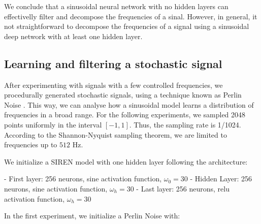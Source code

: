 We conclude that a sinusoidal neural network with no hidden layers can effectivelly filter and decompose the frequencies of a sinal. However, in general, it not straightforward to decompose the frequencies of a signal using a sinusoidal deep network with at least one hidden layer.

\pagebreak

\subsection{Learning and filtering a stochastic signal}




After experimenting with signals with a few controlled frequencies, we procedurally generated stochastic signals, using a technique known as Perlin Noise \cite{perlin-1985}. This way, we can analyse how a sinusoidal model learns a distribution of frequencies in a broad range. For the following experiments, we sampled 2048 points uniformly in the interval $[-1, 1]$. Thus, the sampling rate is 1/1024. According to the Shannon-Nyquist sampling theorem, we are limited to frequencies up to $512$ Hz.

We initialize a SIREN model with one hidden layer following the architecture:

- First layer: 256 neurons, sine activation function, $\omega_0=30$
- Hidden Layer: 256 neurons, sine activation function, $\omega_h=30$
- Last layer: 256 neurons, relu activation function, $\omega_h=30$


In the first experiment, we initialize a Perlin Noise with:

